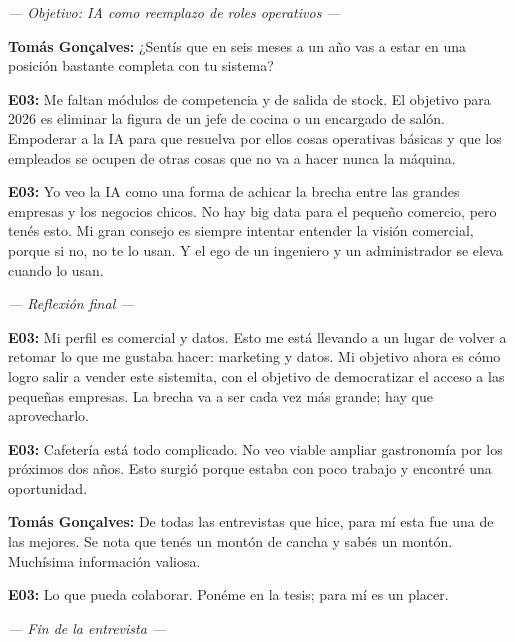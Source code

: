 \noindent\textit{--- Objetivo: IA como reemplazo de roles operativos ---}

\noindent\textbf{Tomás Gonçalves:} ¿Sentís que en seis meses a un año vas a estar en una posición bastante completa con tu sistema?

\noindent\textbf{E03:} Me faltan módulos de competencia y de salida de stock. El objetivo para 2026 es eliminar la figura de un jefe de cocina o un encargado de salón. Empoderar a la IA para que resuelva por ellos cosas operativas básicas y que los empleados se ocupen de otras cosas que no va a hacer nunca la máquina.

\noindent\textbf{E03:} Yo veo la IA como una forma de achicar la brecha entre las grandes empresas y los negocios chicos. No hay big data para el pequeño comercio, pero tenés esto. Mi gran consejo es siempre intentar entender la visión comercial, porque si no, no te lo usan. Y el ego de un ingeniero y un administrador se eleva cuando lo usan.

\noindent\textit{--- Reflexión final ---}

\noindent\textbf{E03:} Mi perfil es comercial y datos. Esto me está llevando a un lugar de volver a retomar lo que me gustaba hacer: marketing y datos. Mi objetivo ahora es cómo logro salir a vender este sistemita, con el objetivo de democratizar el acceso a las pequeñas empresas. La brecha va a ser cada vez más grande; hay que aprovecharlo.

\noindent\textbf{E03:} Cafetería está todo complicado. No veo viable ampliar gastronomía por los próximos dos años. Esto surgió porque estaba con poco trabajo y encontré una oportunidad.

\noindent\textbf{Tomás Gonçalves:} De todas las entrevistas que hice, para mí esta fue una de las mejores. Se nota que tenés un montón de cancha y sabés un montón. Muchísima información valiosa.

\noindent\textbf{E03:} Lo que pueda colaborar. Ponéme en la tesis; para mí es un placer.

\begin{center}\textit{--- Fin de la entrevista ---}\end{center}
